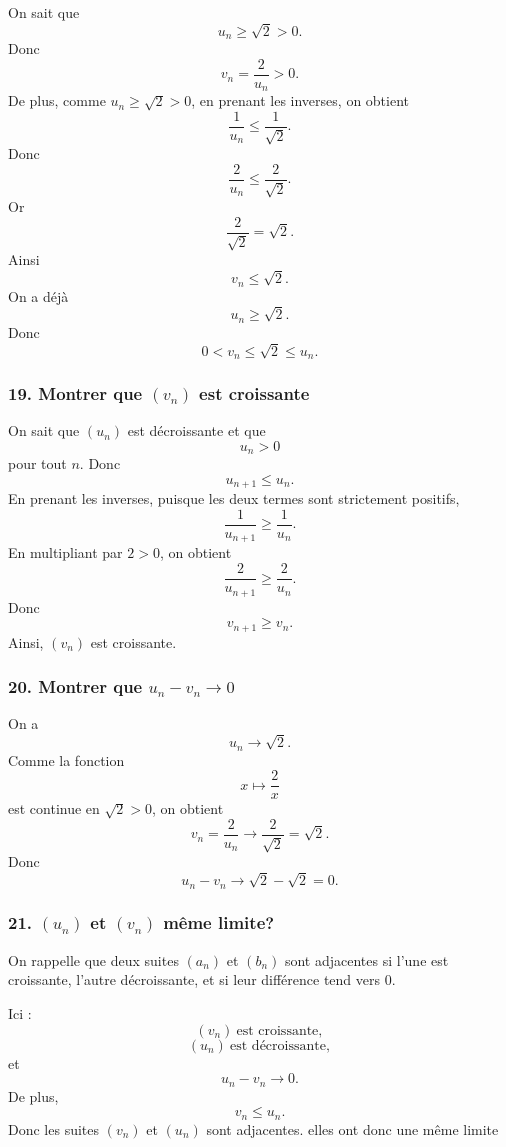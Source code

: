 \documentclass[11pt,a4paper]{article}
\begin{document}
On sait que
\[
u_n\geq\sqrt2>0.
\]
Donc
\[
v_n=\frac2{u_n}>0.
\]
De plus, comme \(u_n\geq\sqrt2>0\), en prenant les inverses, on obtient
\[
\frac1{u_n}\leq \frac1{\sqrt2}.
\]
Donc
\[
\frac2{u_n}\leq \frac2{\sqrt2}.
\]
Or
\[
\frac2{\sqrt2}=\sqrt2.
\]
Ainsi
\[
v_n\leq\sqrt2.
\]
On a déjà
\[
u_n\geq\sqrt2.
\]
Donc
\[
0<v_n\leq\sqrt2\leq u_n.
\]


\subsubsection*{19. Montrer que \((v_n)\) est croissante}

On sait que \((u_n)\) est décroissante et que
\[
u_n>0
\]
pour tout \(n\). Donc
\[
u_{n+1}\leq u_n.
\]
En prenant les inverses, puisque les deux termes sont strictement positifs,
\[
\frac1{u_{n+1}}\geq \frac1{u_n}.
\]
En multipliant par \(2>0\), on obtient
\[
\frac2{u_{n+1}}\geq \frac2{u_n}.
\]
Donc
\[
v_{n+1}\geq v_n.
\]
Ainsi, \((v_n)\) est croissante.


\subsubsection*{20. Montrer que \(u_n-v_n\to 0\)}

On a
\[
u_n\longrightarrow \sqrt2.
\]
Comme la fonction
\[
x\mapsto \frac2x
\]
est continue en \(\sqrt2>0\), on obtient
\[
v_n=\frac2{u_n}\longrightarrow \frac2{\sqrt2}=\sqrt2.
\]
Donc
\[
u_n-v_n\longrightarrow \sqrt2-\sqrt2=0.
\]


\subsubsection*{21. \((u_n)\) et \((v_n)\) même limite?}

On rappelle que deux suites \((a_n)\) et \((b_n)\) sont adjacentes si l'une est croissante, l'autre décroissante, et si leur différence tend vers \(0\).

Ici :
\[
(v_n)\ \text{est croissante},
\]
\[
(u_n)\ \text{est décroissante},
\]
et
\[
u_n-v_n\longrightarrow 0.
\]
De plus,
\[
v_n\leq u_n.
\]
Donc les suites \((v_n)\) et \((u_n)\) sont adjacentes. elles ont donc une même limite
\end{document}
